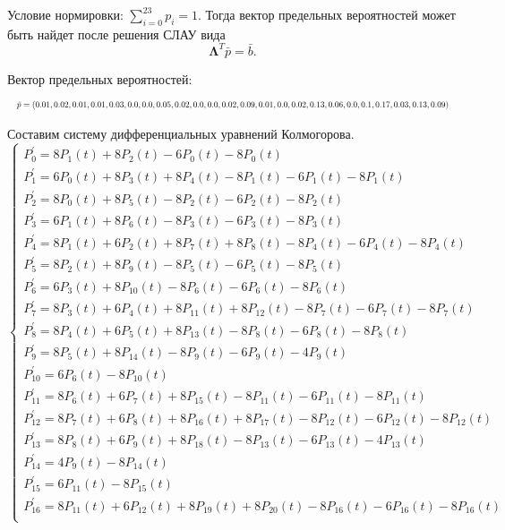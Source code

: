 Условие нормировки: $\sum\limits_{i=0}^{ 23 }p_i=1$.
Тогда вектор предельных вероятностей может быть найдет после решения СЛАУ вида $$\mathbf{\Lambda}^T\bar{p}=\bar{b}.$$

 Вектор предельных вероятностей:
 \[
    \resizebox{\textwidth}{!}{$
    \bar{p}= \left(  0.01, 0.02, 0.01, 0.01, 0.03, 0.0, 0.0, 0.05, 0.02, 0.0, 0.0, 0.02, 0.09, 0.01, 0.0, 0.02, 0.13, 0.06, 0.0, 0.1, 0.17, 0.03, 0.13, 0.09 \right)
    $}
\]

Составим систему дифференциальных уравнений Колмогорова.
\[
\begin{cases}
    P^\prime_{0} = 8P_{1} (t) +8P_{2} (t) -6P_{0} (t) -8P_{0} (t) \\ 
P^\prime_{1} = 6P_{0} (t) +8P_{3} (t) +8P_{4} (t) -8P_{1} (t) -6P_{1} (t) -8P_{1} (t) \\ 
P^\prime_{2} = 8P_{0} (t) +8P_{5} (t) -8P_{2} (t) -6P_{2} (t) -8P_{2} (t) \\ 
P^\prime_{3} = 6P_{1} (t) +8P_{6} (t) -8P_{3} (t) -6P_{3} (t) -8P_{3} (t) \\ 
P^\prime_{4} = 8P_{1} (t) +6P_{2} (t) +8P_{7} (t) +8P_{8} (t) -8P_{4} (t) -6P_{4} (t) -8P_{4} (t) \\ 
P^\prime_{5} = 8P_{2} (t) +8P_{9} (t) -8P_{5} (t) -6P_{5} (t) -8P_{5} (t) \\ 
P^\prime_{6} = 6P_{3} (t) +8P_{10} (t) -8P_{6} (t) -6P_{6} (t) -8P_{6} (t) \\ 
P^\prime_{7} = 8P_{3} (t) +6P_{4} (t) +8P_{11} (t) +8P_{12} (t) -8P_{7} (t) -6P_{7} (t) -8P_{7} (t) \\ 
P^\prime_{8} = 8P_{4} (t) +6P_{5} (t) +8P_{13} (t) -8P_{8} (t) -6P_{8} (t) -8P_{8} (t) \\ 
P^\prime_{9} = 8P_{5} (t) +8P_{14} (t) -8P_{9} (t) -6P_{9} (t) -4P_{9} (t) \\ 
P^\prime_{10} = 6P_{6} (t) -8P_{10} (t) \\ 
P^\prime_{11} = 8P_{6} (t) +6P_{7} (t) +8P_{15} (t) -8P_{11} (t) -6P_{11} (t) -8P_{11} (t) \\ 
P^\prime_{12} = 8P_{7} (t) +6P_{8} (t) +8P_{16} (t) +8P_{17} (t) -8P_{12} (t) -6P_{12} (t) -8P_{12} (t) \\ 
P^\prime_{13} = 8P_{8} (t) +6P_{9} (t) +8P_{18} (t) -8P_{13} (t) -6P_{13} (t) -4P_{13} (t) \\ 
P^\prime_{14} = 4P_{9} (t) -8P_{14} (t) \\ 
P^\prime_{15} = 6P_{11} (t) -8P_{15} (t) \\ 
P^\prime_{16} = 8P_{11} (t) +6P_{12} (t) +8P_{19} (t) +8P_{20} (t) -8P_{16} (t) -6P_{16} (t) -8P_{16} (t) \\ 

\end{cases}\]
